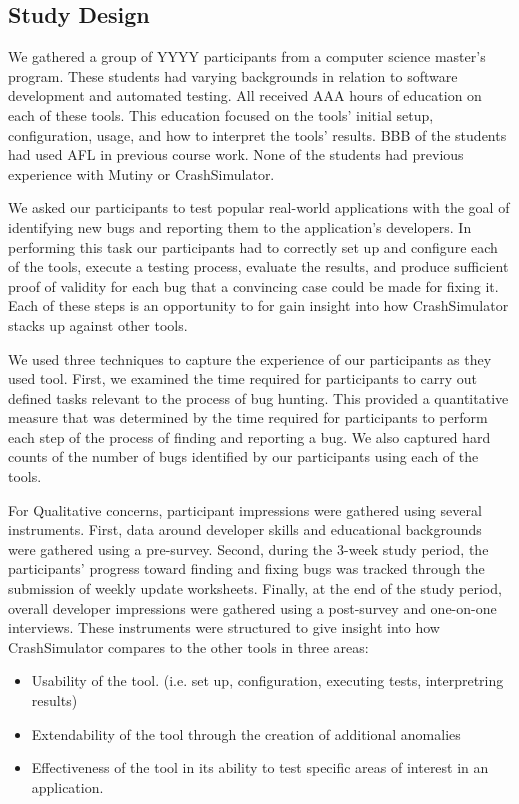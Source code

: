\subsection{Study Design}

We gathered a group of YYYY participants from a computer science master's
program.  These students had varying backgrounds in relation to software
development and automated testing.  All received AAA hours
of education on each of these tools.  This education focused on the tools'
initial setup, configuration, usage, and how to interpret the tools'
results.  BBB of the students had used AFL in previous course work.  None
of the students had previous experience with Mutiny or CrashSimulator.

We asked our participants to test popular real-world applications with the
goal of identifying new bugs and reporting them to the application's
developers.  In performing this task our participants had to correctly set
up and configure each of the tools, execute a testing process, evaluate the
results, and produce sufficient proof of validity for each bug that a
convincing case could be made for fixing it.  Each of these steps is an
opportunity to for gain insight into how CrashSimulator stacks up against
other tools.

We used three techniques to capture the experience of our participants as
they used tool.  First, we examined the time required for participants to
carry out defined tasks relevant to the process of bug hunting. This
provided a quantitative measure that was determined by the time required
for participants to perform each step of the process of finding and
reporting a bug.  We also captured hard counts of the number of bugs
identified by our participants using each of the tools.

For Qualitative concerns, participant impressions were gathered using
several instruments.  First, data around developer skills and educational
backgrounds were gathered using a pre-survey.  Second, during the 3-week
study period, the participants' progress toward finding and fixing bugs was
tracked through the submission of weekly update worksheets.  Finally, at
the end of the study period, overall developer impressions were gathered
using a post-survey and one-on-one interviews.  These instruments were
structured to give insight into how CrashSimulator compares to the other
tools in three areas:

\begin{itemize}

\item Usability of the tool. (i.e. set up, configuration, executing tests,
interpretring results)

\item Extendability of the tool through the creation of additional
anomalies

\item Effectiveness of the tool in its ability to test specific areas of
interest in an application.

\end{itemize}

